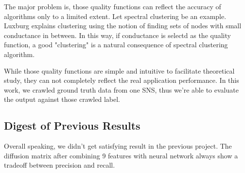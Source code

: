 \documentclass[11pt,a4paper]{article}
\begin{document}
The major problem is, those quality functions can reflect 
the accuracy of algorithms only to a limited extent. 
Let spectral clustering be an example. Luxburg\cite{von2007tutorial}
explains clustering using the notion of finding sets of nodes 
with small conductance in between. In this way, if conductance 
is selectd as the quality function, a good "clustering" is 
a natural consequence of spectral clustering algorithm. 

While those quality functions are simple and intuitive to 
facilitate theoretical study, they can not completely reflect the 
real application performance. In this work, we crawled ground truth
data from one SNS, thus we're able to evaluate the output 
against those crawled label. 

\subsection{Digest of Previous Results}

Overall speaking, we didn't get satisfying result in the previous project. 
The diffusion matrix after combining 9 features with neural network
always show a tradeoff between precision and recall. 
\end{document}
